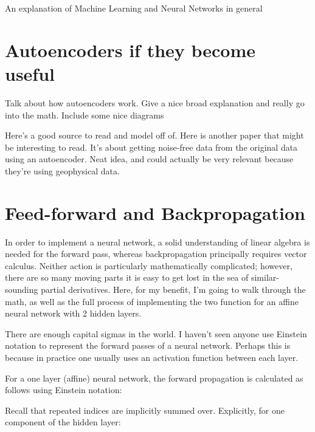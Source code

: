 An explanation of Machine Learning and Neural Networks in general

\section{Autoencoders if they become useful}
Talk about how autoencoders work. Give a nice broad explanation and really go into the math. Include some nice diagrams

Here's \cite{ng2011sparse} a good source to read and model off of. Here \cite{Bhowick2019} is another paper that might be interesting to read. It's about getting noise-free data from the original data using an autoencoder. Neat idea, and could actually be very relevant because they're using geophysical data.

\section{Feed-forward and Backpropagation}

In order to implement a neural network, a solid understanding of linear algebra is needed for the forward pass, whereas backpropagation principally requires vector calculus. Neither action is particularly mathematically complicated; however, there are so many moving parts it is easy to get lost in the sea of similar-sounding partial derivatives. Here, for my benefit, I'm going to walk through the math, as well as the full process of implementing the two function for an affine neural network with 2 hidden layers.


There are enough capital sigmas in the world. I haven't seen anyone use Einstein notation to represent the forward passes of a neural network. Perhaps this is because in practice one usually uses an activation function between each layer.

For a one layer (affine) neural network, the forward propagation is calculated as follows using Einstein notation:


Recall that repeated indices are implicitly summed over. Explicitly, for one component of the hidden layer:

